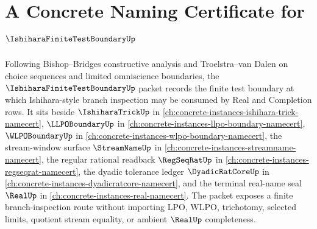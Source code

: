 \chapter{A Concrete Naming Certificate for $\IshiharaFiniteTestBoundaryUp$}
\label{ch:concrete-instances-ishihara-finite-test-boundary-namecert}

Following Bishop--Bridges constructive analysis and Troelstra--van Dalen on choice sequences and limited omniscience boundaries, the $\IshiharaFiniteTestBoundaryUp$ packet records the finite test boundary at which Ishihara-style branch inspection may be consumed by Real and Completion rows. It sits beside $\IshiharaTrickUp$ in \autoref{ch:concrete-instances-ishihara-trick-namecert}, $\LLPOBoundaryUp$ in \autoref{ch:concrete-instances-llpo-boundary-namecert}, $\WLPOBoundaryUp$ in \autoref{ch:concrete-instances-wlpo-boundary-namecert}, the stream-window surface $\StreamNameUp$ in \autoref{ch:concrete-instances-streamname-namecert}, the regular rational readback $\RegSeqRatUp$ in \autoref{ch:concrete-instances-regseqrat-namecert}, the dyadic tolerance ledger $\DyadicRatCoreUp$ in \autoref{ch:concrete-instances-dyadicratcore-namecert}, and the terminal real-name seal $\RealUp$ in \autoref{ch:concrete-instances-real-namecert}. The packet exposes a finite branch-inspection route without importing LPO, WLPO, trichotomy, selected limits, quotient stream equality, or ambient $\RealUp$ completeness.

